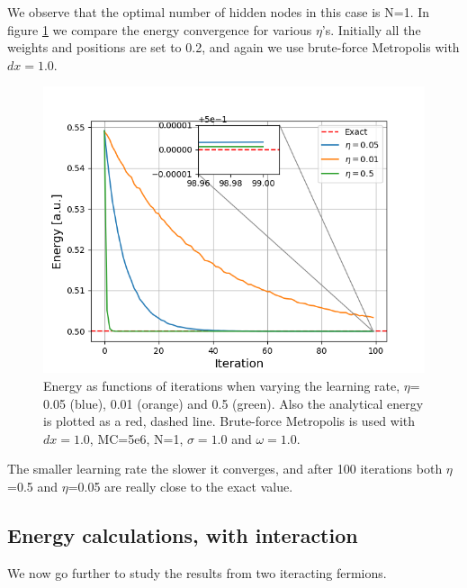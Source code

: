 \documentclass[norsk,a4paper,12pt]{article}
\begin{document}
We observe that the optimal number of hidden nodes in this case is N=1. In figure \ref{fig:compare_etas} we compare the energy convergence for various $\eta$'s.  Initially all the weights and positions are set to 0.2, and again we use brute-force Metropolis with $dx=1.0$.

 \begin{figure} [H]
 	\centering
 	\includegraphics[scale=0.8]{plots/energy_compare_eta.png}
 	\caption{Energy as functions of iterations when varying the learning rate, $\eta$= 0.05 (blue), 0.01 (orange) and 0.5 (green). Also the analytical energy is plotted as a red, dashed line. Brute-force Metropolis is used with $dx=1.0$, MC=5e6, N=1, $\sigma=1.0$ and $\omega=1.0$.}
 	\label{fig:compare_etas}
 \end{figure}
The smaller learning rate the slower it converges, and after 100 iterations both $\eta$=0.5 and $\eta$=0.05 are really close to the exact value. 

\subsection{Energy calculations, with interaction}
We now go further to study the results from two iteracting fermions. 
\end{document}
